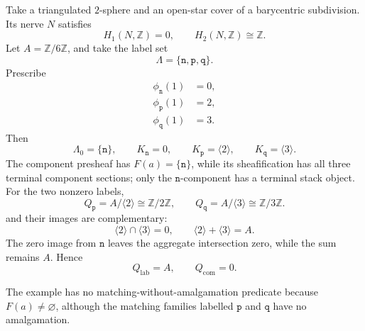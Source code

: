 Take a triangulated \(2\)-sphere and an open-star cover of a barycentric
subdivision.  Its nerve \(N\) satisfies
\[
 H_1(N,\mathbb Z)=0,\qquad H_2(N,\mathbb Z)\cong\mathbb Z.
\]
Let \(A=\mathbb Z/6\mathbb Z\), and take the label set
\[
 \Lambda=\{\mathtt n,\mathtt p,\mathtt q\}.
\]
Prescribe
\[
\begin{aligned}
 \phi_{\mathtt n}(1)&=0,\\
 \phi_{\mathtt p}(1)&=2,\\
 \phi_{\mathtt q}(1)&=3.
\end{aligned}
\]
Then
\[
 \Lambda_0=\{\mathtt n\},\qquad
 K_{\mathtt n}=0,\qquad
 K_{\mathtt p}=\langle2\rangle,\qquad
 K_{\mathtt q}=\langle3\rangle.
\]
The component presheaf has \(F(a)=\{\mathtt n\}\), while its sheafification
has all three terminal component sections; only the \(\mathtt n\)-component
has a terminal stack object.  For the two nonzero labels,
\[
 Q_{\mathtt p}=A/\langle2\rangle\cong\mathbb Z/2\mathbb Z,
 \qquad
 Q_{\mathtt q}=A/\langle3\rangle\cong\mathbb Z/3\mathbb Z.
\]
and their images are complementary:
\[
 \langle2\rangle\cap\langle3\rangle=0,
 \qquad
 \langle2\rangle+\langle3\rangle=A.
\]
The zero image from \(\mathtt n\) leaves the aggregate intersection zero,
while the sum remains \(A\).  Hence
\[
 Q_{\mathrm{lab}}=A,\qquad Q_{\mathrm{com}}=0.
\]

The example has no matching-without-amalgamation predicate because
\(F(a)\ne\varnothing\), although the matching families labelled
\(\mathtt p\) and \(\mathtt q\) have no amalgamation.
